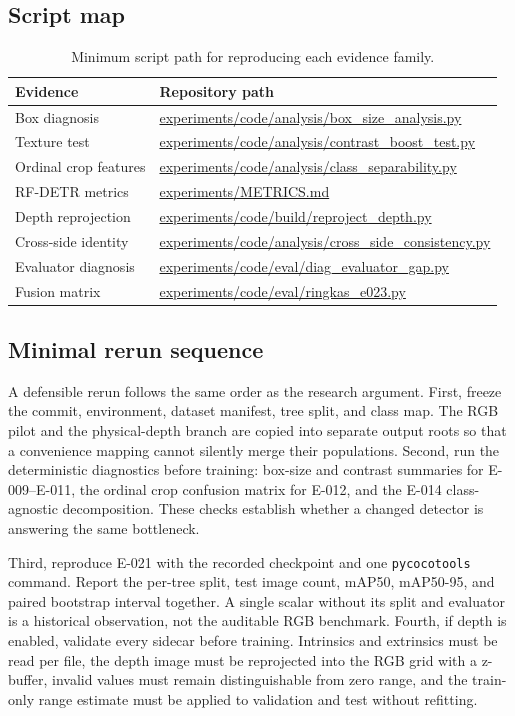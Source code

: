 \documentclass[preprint,12pt]{elsarticle}
\newcommand{\pathcode}[1]{\scriptsize\url{#1}}
\begin{document}
\subsection{Script map}
\begin{table}[H]
\centering
\caption{Minimum script path for reproducing each evidence family.}
\label{tab:scripts}
\begin{tabular}{L{0.37\columnwidth}L{0.51\columnwidth}}
\toprule
Evidence & Repository path\\
\midrule
Box diagnosis & \pathcode{experiments/code/analysis/box_size_analysis.py}\\
Texture test & \pathcode{experiments/code/analysis/contrast_boost_test.py}\\
Ordinal crop features & \pathcode{experiments/code/analysis/class_separability.py}\\
RF-DETR metrics & \pathcode{experiments/METRICS.md}\\
Depth reprojection & \pathcode{experiments/code/build/reproject_depth.py}\\
Cross-side identity & \pathcode{experiments/code/analysis/cross_side_consistency.py}\\
Evaluator diagnosis & \pathcode{experiments/code/eval/diag_evaluator_gap.py}\\
Fusion matrix & \pathcode{experiments/code/eval/ringkas_e023.py}\\
\bottomrule
\end{tabular}
\end{table}

\subsection{Minimal rerun sequence}

A defensible rerun follows the same order as the research argument. First,
freeze the commit, environment, dataset manifest, tree split, and class map.
The RGB pilot and the physical-depth branch are copied into separate output
roots so that a convenience mapping cannot silently merge their populations.
Second, run the deterministic diagnostics before training: box-size and
contrast summaries for E-009--E-011, the ordinal crop confusion matrix for
E-012, and the E-014 class-agnostic decomposition. These checks establish
whether a changed detector is answering the same bottleneck.

Third, reproduce E-021 with the recorded checkpoint and one
\texttt{pycocotools} command. Report the per-tree split, test image count,
mAP50, mAP50-95, and paired bootstrap interval together. A single scalar
without its split and evaluator is a historical observation, not the auditable
RGB benchmark. Fourth, if depth is enabled, validate every sidecar before
training. Intrinsics and extrinsics must be read per file, the depth image
must be reprojected into the RGB grid with a z-buffer, invalid values must
remain distinguishable from zero range, and the train-only range estimate
must be applied to validation and test without refitting.
\end{document}
